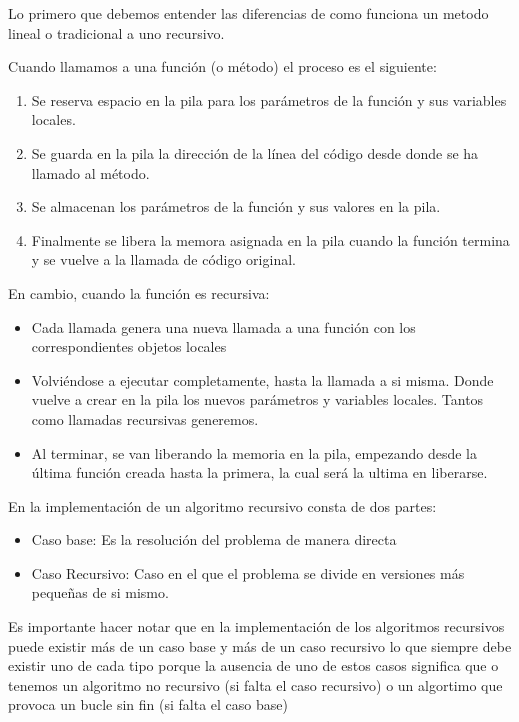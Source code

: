 Lo primero que debemos entender las diferencias de como funciona un metodo lineal o tradicional a uno recursivo. 

Cuando llamamos a una función (o método) el proceso es el siguiente:

\begin{enumerate}
	\item Se reserva espacio en la pila para los parámetros de la función y sus variables locales.
	\item Se guarda en la pila la dirección de la línea del código desde donde se ha llamado al método.
	\item Se almacenan los parámetros de la función y sus valores en la pila.
	\item Finalmente se libera la memora asignada en la pila cuando la función termina y se vuelve a la llamada de código original.
\end{enumerate}

En cambio, cuando la función es recursiva:

\begin{itemize}
	\item Cada llamada genera una nueva llamada a una función con los correspondientes objetos locales
	\item Volviéndose a ejecutar completamente, hasta la llamada a si misma. Donde vuelve a crear en la pila los nuevos parámetros y variables locales. Tantos como llamadas recursivas generemos.
	\item Al terminar, se van liberando la memoria en la pila, empezando desde la última función creada hasta la primera, la cual será la ultima en liberarse.
\end{itemize}

En la implementación de un algoritmo recursivo consta de dos partes:
\begin{itemize}
	\item Caso base: Es la resolución del problema de manera
directa
	\item Caso Recursivo: Caso en el que el problema se divide en
versiones más pequeñas de si mismo.
\end{itemize}

Es importante hacer notar que en la implementación de los algoritmos recursivos puede existir más de un caso base y más de un caso recursivo lo que siempre debe existir uno de cada tipo porque la ausencia de uno de estos casos significa que o tenemos un algoritmo no recursivo (si falta el caso recursivo) o un algortimo que provoca un bucle sin fin (si falta el caso base)

